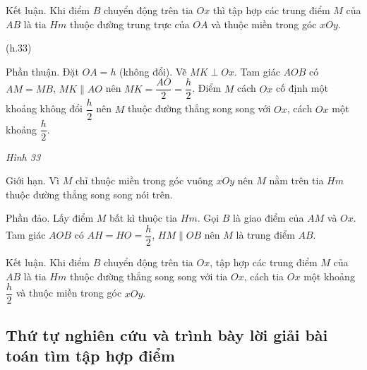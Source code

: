 \begin{vd}
{\begin{description}
		Kết luận. Khi điểm $B$ chuyển động trên tia $Ox$ thì tập hợp các trung điểm $M$ của $AB$ là tia $Hm$ thuộc đường trung trực của $OA$ và thuộc miền trong góc $xOy$.
		\item[Cách 2.] (h.33)
		
		Phần thuận. Đặt $OA = h$ (không đổi). Vẽ $MK \perp Ox$. Tam giác $AOB$ có $AM = MB$, $MK \parallel AO$ nên $MK = \dfrac{AO}{2} = \dfrac{h}{2}$. Điểm $M$ cách $Ox$ cố định một khoảng không đổi $\dfrac{h}{2}$ nên $M$ thuộc đường thẳng song song với $Ox$, cách $Ox$ một khoảng $\dfrac{h}{2}$.
		
	\begin{center}

\textit{Hình 33}
	\end{center}
		
		Giới hạn. Vì $M$ chỉ thuộc miền trong góc vuông $xOy$ nên $M$ nằm trên tia $Hm$ thuộc đường thẳng song song nói trên.
		
		Phần đảo. Lấy điểm $M$ bất kì thuộc tia $Hm$. Gọi $B$ là giao điểm của $AM$ và $Ox$. Tam giác $AOB$ có $AH = HO = \dfrac{h}{2}$, $HM \parallel OB$ nên $M$ là trung điểm $AB$.
		
		Kết luận. Khi điểm $B$ chuyển động trên tia $Ox$,  tập hợp các trung điểm $M$ của $AB$ là tia $Hm$ thuộc đường thẳng song song với tia $Ox$, cách tia $Ox$ một khoảng $\dfrac{h}{2}$ và thuộc miền trong góc $xOy$.
	\end{description}
	}
	\end{vd}
	
\subsection{Thứ tự nghiên cứu và trình bày lời giải bài toán tìm tập hợp điểm}

